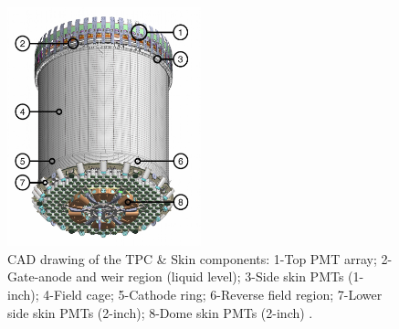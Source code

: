 \begin{figure}[ht!]
     \centering
     \includegraphics[width=0.5\textwidth]{figures/LZ/CAD_TPC.jpg}
     \caption{CAD drawing of the TPC \& Skin components: 1-Top PMT array; 2-Gate-anode and weir region (liquid level); 3-Side skin PMTs (1-inch); 4-Field cage; 5-Cathode ring; 6-Reverse field region; 7-Lower side skin PMTs (2-inch); 8-Dome skin PMTs (2-inch) \cite{LZNIMA}.}
     \label{fig:CAD_TPC}
\end{figure}

